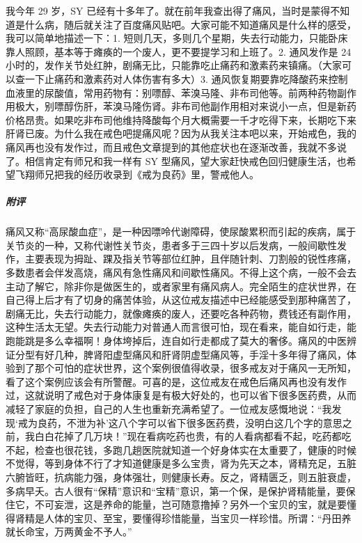 \begin{case}
    我今年 29 岁，SY 已经有十多年了。就在前年我查出得了痛风，当时是蒙得不知道是什么病，随后就关注了百度痛风贴吧。大家可能不知道痛风是什么样的感受，我可以简单地描述一下：1. 短则几天，多则几个星期，失去行动能力，只能卧床靠人照顾，基本等于瘫痪的一个废人，更不要提学习和上班了。2. 通风发作是 24 小时的，发作关节处红肿，剧痛无比，只能靠吃止痛药和激素药来镇痛。（大家可以查一下止痛药和激素药对人体伤害有多大）3. 通风恢复期要靠吃降酸药来控制血液里的尿酸值，常用药物有：别嘌醇、苯溴马隆、非布司他等。前两种药物副作用极大，别嘌醇伤肝，苯溴马隆伤肾。非布司他副作用相对来说小一点，但是新药价格昂贵。如果吃非布司他维持降酸每个月大概需要一千才吃得下来，长期吃下来肝肾已废。为什么我在戒色吧提痛风呢？因为从我关注本吧以来，开始戒色，我的痛风再也没有发作过，而且戒色文章提到的其他症状也在逐渐改善，我就不多说了。相信肯定有师兄和我一样有 SY 型痛风，望大家赶快戒色回归健康生活，也希望飞翔师兄把我的经历收录到《戒为良药》里，警戒他人。
    \subparagraph{附评} 痛风又称“高尿酸血症”，是一种因嘌呤代谢障碍，使尿酸累积而引起的疾病，属于关节炎的一种，又称代谢性关节炎，患者多于三四十岁以后发病，一般间歇性发作，主要表现为拇趾、踝及指关节等部位红肿，且伴随针刺、刀割般的锐性疼痛，多数患者会伴发高烧，痛风有急性痛风和间歇性痛风。不得上这个病，一般不会去主动了解它，除非你是做医生的，或者家里有痛风病人。完全陌生的症状世界，在自己得上后才有了切身的痛苦体验，从这位戒友描述中已经能感受到那种痛苦了，剧痛无比，失去行动能力，就像瘫痪的废人，还要吃各种药物，费钱还有副作用，这种生活太无望。失去行动能力对普通人而言很可怕，现在看来，能自如行走，能跑能跳是多么幸福啊！身体垮掉后，连自如行走都成了莫大的奢侈。痛风的中医辨证分型有好几种，脾肾阳虚型痛风和肝肾阴虚型痛风等，手淫十多年得了痛风，体验到了那个可怕的症状世界，这个案例很值得收录，很多戒友对于痛风一无所知，看了这个案例应该会有所警醒。可喜的是，这位戒友在戒色后痛风再也没有发作过，这就说明了戒色对于身体康复是有极大好处的，也可以省下很多医药费，从而减轻了家庭的负担，自己的人生也重新充满希望了。一位戒友感慨地说：“我发现‘戒为良药，不泄为补’这八个字可以省下很多医药费，没明白这几个字的意思之前，我白白花掉了几万块！”现在看病吃药也贵，有的人看病都看不起，吃药都吃不起，检查也很花钱，多跑几趟医院就知道一个好身体实在太重要了，健康的时候不觉得，等到身体不行了才知道健康是多么宝贵，肾为先天之本，肾精充足，五脏六腑皆旺，抗病能力强，身体强壮，则健康长寿。反之，肾精匮乏，则五脏衰虚，多病早夭。古人很有“保精”意识和“宝精”意识，第一个保，是保护肾精能量，要保住它，不可妄泄，这是养命的能量，岂可随意撸掉？另外一个宝贝的宝，就是要懂得肾精是人体的宝贝、至宝，要懂得珍惜能量，当宝贝一样珍惜。所谓：“丹田养就长命宝，万两黄金不予人。”
\end{case}

